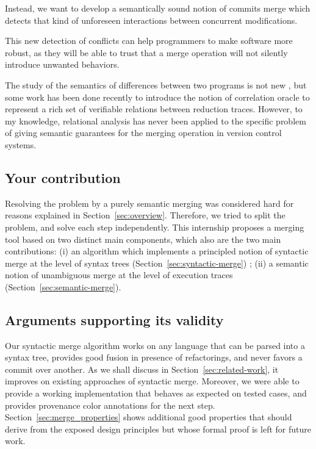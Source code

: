 \documentclass[a4paper,11pt]{article}
\newcommand\todo[1]{}%
\begin{document}
Instead, we want to develop a semantically sound notion of commits
merge which detects that kind of unforeseen interactions between
concurrent modifications.

This new detection of conflicts can help programmers to make software
more robust, as they will be able to trust that a merge operation will
not silently introduce unwanted behaviors.

The study of the semantics of differences between two programs is not
new \cite{benton2004simple}, but some work has been done recently to
introduce the notion of correlation oracle \cite{girka2017verifiable}
to represent a rich set of verifiable relations between reduction
traces. However, to my knowledge, relational analysis has never been
applied to the specific problem of giving semantic guarantees for the
merging operation in version control systems.

\subsection*{Your contribution}


Resolving the problem by a purely semantic merging was considered hard
for reasons explained in Section~\ref{sec:overview}. Therefore, we
tried to split the problem, and solve each step independently. This
internship proposes a merging tool based on two distinct main
components, which also are the two main contributions: (i) an
algorithm which implements a principled notion of syntactic merge at
the level of syntax trees (Section~\ref{sec:syntactic-merge}) ; (ii) a
semantic notion of unambiguous merge at the level of execution traces
(Section~\ref{sec:semantic-merge}).

\subsection*{Arguments supporting its validity}


Our syntactic merge algorithm works on any language that can be parsed
into a syntax tree, provides good fusion in presence of refactorings,
and never favors a commit over another. As we shall discuss in
Section~\ref{sec:related-work}, it improves on existing approaches of
syntactic merge. Moreover, we were able to provide a working
implementation that behaves as expected on tested cases, and provides
provenance color annotations for the next step.
Section~\ref{sec:merge_properties} shows additional good properties
that should derive from the exposed design principles but whose formal
proof is left for future work.
\end{document}
